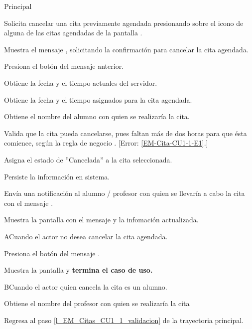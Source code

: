 \begin{UCtrayectoria}{Principal}

	\UCpaso [\UCactor] Solicita cancelar una cita previamente agendada presionando sobre el icono  de alguna de las citas agendadas de la pantalla .

	\UCpaso Muestra el mensaje , solicitando la confirmación para cancelar la cita agendada. 

	\UCpaso Presiona el botón  del mensaje anterior.  
 
	\UCpaso Obtiene la fecha y el tiempo actuales del servidor.

	\UCpaso Obtiene la fecha y el tiempo asignados para la cita agendada.

	\UCpaso Obtiene el nombre del alumno con quien se realizaría la cita. 

	\UCpaso Valida que la cita pueda cancelarse, pues faltan más de dos horas para que ésta comience, según la regla de negocio . [Error: \ref{EM-Cita-CU1-1-E1}.] \label{l_EM_Citas_CU1_1_validacion}

	\UCpaso Asigna el estado de ''Cancelada'' a la cita seleccionada. 

	\UCpaso Persiste la información en sistema. 

	\UCpaso Envía una notificación al alumno / profesor con quien se llevaría a cabo la cita con el mensaje .

	\UCpaso Muestra la pantalla  con el mensaje  y la infomación actualizada.
	

\end{UCtrayectoria}

\begin{UCtrayectoriaA}{A}{Cuando el actor no desea cancelar la cita agendada.}

	\UCpaso Presiona el botón  del mensaje .

	\UCpaso Muestra la pantalla  y \textbf{termina el caso de uso.}

\end{UCtrayectoriaA}

\begin{UCtrayectoriaA}{B}{Cuando el actor quien cancela la cita es un alumno.}

	\UCpaso Obtiene el nombre del profesor con quien se realizaría la cita

	\UCpaso Regresa al paso \ref{l_EM_Citas_CU1_1_validacion} de la trayectoria principal.

\end{UCtrayectoriaA}